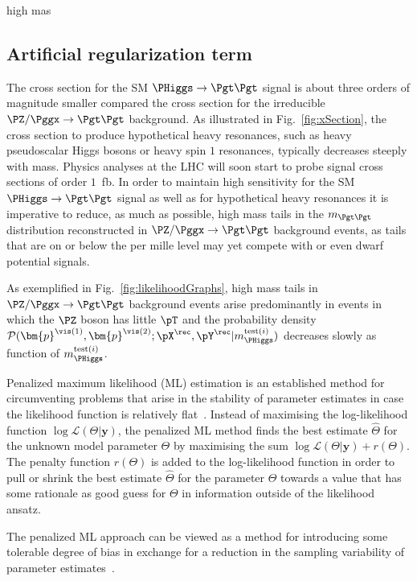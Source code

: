 high mas\subsection{Artificial regularization term}
\label{sec:mem_logM}

The cross section for the SM $\PHiggs \to \Pgt\Pgt$ signal is about three orders of magnitude smaller 
compared the cross section for the irreducible $\PZ/\Pggx \to \Pgt\Pgt$ background.
As illustrated in Fig.~\ref{fig:xSection},
the cross section to produce hypothetical heavy resonances, such as heavy pseudoscalar Higgs bosons or heavy spin $1$ resonances,
typically decreases steeply with mass.
Physics analyses at the LHC will soon start to probe signal cross sections of order $1$~fb.
In order to maintain high sensitivity for the SM $\PHiggs \to \Pgt\Pgt$ signal as well as for hypothetical heavy resonances
it is imperative to reduce, as much as possible, high mass tails in the $m_{\Pgt\Pgt}$ distribution reconstructed in $\PZ/\Pggx \to \Pgt\Pgt$ background events,
as tails that are on or below the per mille level may yet compete with or even dwarf potential signals.

As exemplified in Fig.~\ref{fig:likelihoodGraphs},
high mass tails in $\PZ/\Pggx \to \Pgt\Pgt$ background events arise predominantly in events in which the $\PZ$ boson has little $\pT$
and the probability density $\mathcal{P}(\bm{p}^{\vis(1)},\bm{p}^{\vis(2)};\pX^{\rec},\pY^{\rec}|m_{\PHiggs}^{\textrm{test}(i)})$ 
decreases slowly as function of $m_{\PHiggs}^{\textrm{test}(i)}$.

Penalized maximum likelihood (ML) estimation is an established method for circumventing problems 
that arise in the stability of parameter estimates in case the likelihood function is relatively flat~\cite{penalizedMaximumLikelihood1}.
Instead of maximising the log-likelihood function $\log \mathcal{L}(\Theta|\bm{y})$,
the penalized ML method finds the best estimate $\hat{\Theta}$ for the unknown model parameter $\Theta$ by maximising the sum $\log \mathcal{L}(\Theta|\bm{y}) + r(\Theta)$.
The penalty function $r(\Theta)$ is added to the log-likelihood function in order to pull or shrink the best estimate $\hat{\Theta}$ for the parameter $\Theta$
towards a value that has some rationale as good guess for $\Theta$ in information outside of the likelihood ansatz.

The penalized ML approach can be viewed as a method for introducing some tolerable degree of bias 
in exchange for a reduction in the sampling variability of parameter estimates~\cite{penalizedMaximumLikelihood2}.

